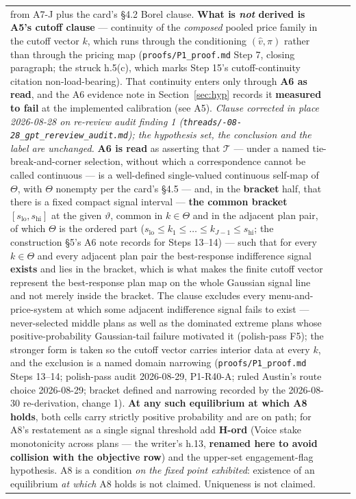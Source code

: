 \documentclass[11pt,a4paper]{article}
\newcommand{\Tmap}{\mathcal{T}}
\begin{document}
\begin{longtable}{@{}p{}>{\raggedright\arraybackslash}p{}>{\raggedright\arraybackslash}p{}@{}}
from A7-J plus the card's \S4.2 Borel clause. \textbf{What is \emph{not} derived is A5's
cutoff clause} --- continuity of the \emph{composed} pooled price family in the cutoff
vector $k$, which runs through the conditioning $(\hat v,\pi)$ rather than through the
pricing map (\texttt{proofs/P1\_proof.md} Step 7, closing paragraph; the struck h.5(c),
which marks Step 15's cutoff-continuity citation non-load-bearing). That continuity enters
only through \textbf{A6 as read}, and the A6 evidence note in Section~\ref{sec:hyp}
records it \textbf{measured to fail} at the implemented calibration (see A5).
\emph{Clause corrected in place 2026-08-28 on re-review audit finding 1
(\texttt{threads/\allowbreak 2026-08-28\_\allowbreak gpt\_\allowbreak rereview\_\allowbreak audit.md}); the hypothesis set, the
conclusion and the label are unchanged.} \textbf{A6 is read} as asserting that $\Tmap$ --- under a named
tie-break-and-corner selection, without which a correspondence cannot be called
continuous --- is a well-defined single-valued continuous self-map of $\Theta$, with
$\Theta$ nonempty per the card's \S4.5 --- and, in the \textbf{bracket} half, that there is a
fixed compact signal interval --- \textbf{the common bracket}
$[s_{\mathrm{lo}},s_{\mathrm{hi}}]$ at the given $\vartheta$, common in $k\in\Theta$ and in
the adjacent plan pair, of which $\Theta$ is the ordered part
($s_{\mathrm{lo}}\le k_1\le\dots\le k_{J-1}\le s_{\mathrm{hi}}$; the construction \S5's A6
note records for Steps 13--14) --- such that for every $k\in\Theta$ and every adjacent plan
pair the best-response indifference signal \textbf{exists} and lies in the bracket, which is
what makes the finite cutoff vector represent the best-response plan map on the whole
Gaussian signal line and not merely inside the bracket. The clause excludes every
menu-and-price-system at which some adjacent indifference signal fails to exist ---
never-selected middle plans as well as the dominated extreme plans whose
positive-probability Gaussian-tail failure motivated it (polish-pass F5); the stronger form
is taken so the cutoff vector carries interior data at every $k$, and the exclusion is a
named domain narrowing (\texttt{proofs/P1\_proof.md} Steps 13--14; polish-pass audit
2026-08-29, P1-R40-A; ruled Austin's route choice 2026-08-29; bracket defined and narrowing
recorded by the 2026-08-30 re-derivation, change 1). \textbf{At any such equilibrium at which A8
holds}, both cells carry strictly positive probability and are on path; for A8's
restatement as a single signal threshold add \textbf{H-ord} (Voice stake monotonicity
across plans --- the writer's h.13, \textbf{renamed here to avoid collision with the
objective row}) and the upper-set engagement-flag hypothesis. A8 is a condition
\emph{on the fixed point exhibited}: existence of an equilibrium \emph{at which} A8 holds
is not claimed. Uniqueness is not claimed. &
\\


\end{longtable}
\end{document}
